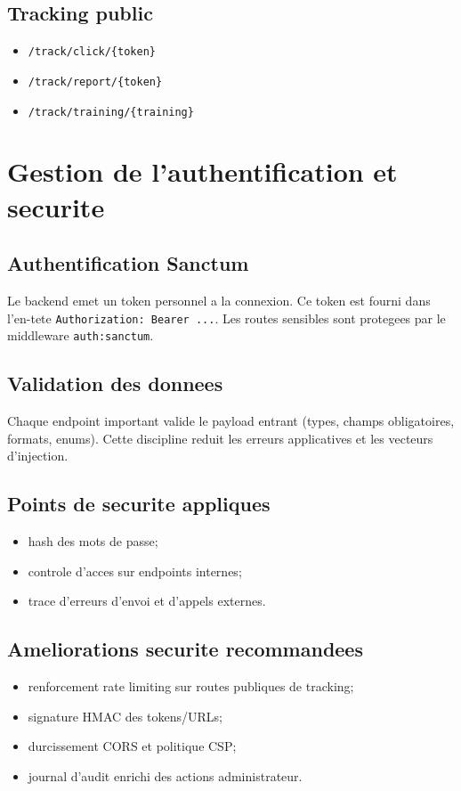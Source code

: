 \documentclass[12pt,a4paper,oneside]{report}
\begin{document}
\subsection{Tracking public}
\begin{itemize}[leftmargin=1.2cm]
  \item \texttt{/track/click/\{token\}}
  \item \texttt{/track/report/\{token\}}
  \item \texttt{/track/training/\{training\}}
\end{itemize}

\section{Gestion de l'authentification et securite}
\subsection{Authentification Sanctum}
Le backend emet un token personnel a la connexion. Ce token est fourni dans l'en-tete \texttt{Authorization: Bearer ...}. Les routes sensibles sont protegees par le middleware \texttt{auth:sanctum}.

\subsection{Validation des donnees}
Chaque endpoint important valide le payload entrant (types, champs obligatoires, formats, enums). Cette discipline reduit les erreurs applicatives et les vecteurs d'injection.

\subsection{Points de securite appliques}
\begin{itemize}[leftmargin=1.2cm]
  \item hash des mots de passe;
  \item controle d'acces sur endpoints internes;
  \item trace d'erreurs d'envoi et d'appels externes.
\end{itemize}

\subsection{Ameliorations securite recommandees}
\begin{itemize}[leftmargin=1.2cm]
  \item renforcement rate limiting sur routes publiques de tracking;
  \item signature HMAC des tokens/URLs;
  \item durcissement CORS et politique CSP;
  \item journal d'audit enrichi des actions administrateur.
\end{itemize}
\end{document}
